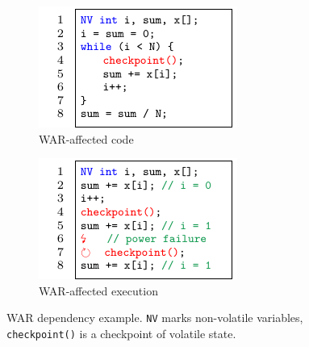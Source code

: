 \begin{figure}
	\begin{subfigure}{0.49\columnwidth}
		\includegraphics[width=\columnwidth]{figures/war-example.pdf}
		\caption{WAR-affected code}
		\label{fig:war-example}
	\end{subfigure}
	\begin{subfigure}{0.49\columnwidth}
		\includegraphics[width=\columnwidth]{figures/war-execution.pdf}
		\caption{WAR-affected execution}
		\label{fig:war-execution}
	\end{subfigure}
	\caption{WAR dependency example. \texttt{NV} marks non-volatile variables, \texttt{checkpoint()} is a checkpoint of volatile state.	\label{fig:w-a-r}}
\end{figure}

